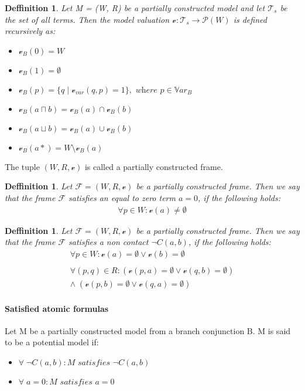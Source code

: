 \documentclass{article}
\newtheorem{defn}[theorem]{Deffinition}
\newcommand{\vVar}{\mathscr{v}_{var}}
\newcommand{\Var}{\mathbb{V}ar}
\newcommand{\vE}{\mathscr{v}}
\newcommand{\vBool}{\mathscr{v}_B}
\newcommand{\Ts}{\mathcal{T}_s}
\begin{document}
	\begin{defn}
		Let M = (W, R) be a partially constructed model and let $\Ts$ be the set of all terms. Then the model valuation $\vE : \Ts \rightarrow \mathscr{P}(W)$ is defined recursively as:
		\begin{itemize}
			\item $\vBool(0) = W$
			\item $\vBool(1) = \emptyset$
			\item $\vBool(p) = \{ q \; | \; \vVar(q, p) = 1\}, \textit{ where } p \in \Var_B$
			\item $\vBool(a \sqcap b) = \vBool(a) \cap \vBool(b)$
			\item $\vBool(a \sqcup b) = \vBool(a) \cup \vBool(b)$
			\item $\vBool(a*) = W \setminus \vBool(a)$
		\end{itemize}
	\end{defn}
		The tuple $(W, R, \vE)$ is called a partially constructed frame.
	\begin{defn}
		Let $\mathscr{F} = (W, R, \vE)$ be a partially constructed frame. Then we say that the frame $\mathscr{F}$ satisfies an equal to zero term $a = 0$, if the following holds:
		\begin{align*}
			\forall p \in W: \vE(a) \ne \emptyset
		\end{align*}
	\end{defn}

	\begin{defn}
		Let $\mathscr{F} = (W, R, \vE)$ be a partially constructed frame. Then we say that the frame $\mathscr{F}$ satisfies a non contact $\neg C(a, b)$, if the following holds:
		\begin{align*}
			\forall p \in W: \vE(a) = \emptyset \lor \vE(b) = \emptyset \\
			\\
			\forall (p, q) \in R: (\vE(p, a) = \emptyset \lor \vE(q, b) = \emptyset) \\ 
				\land \; (\vE(p, b) = \emptyset \lor \vE(q, a) = \emptyset)
		\end{align*}
	\end{defn}													

	\paragraph{Satisfied atomic formulas}
		Let M be a partially constructed model from a branch conjunction B. M is said to be a potential model if: 
		\begin{itemize}
			\item $\forall \; \neg C(a, b) : M \textit{ satisfies } \neg C(a, b)$
			\item $\forall \; a = 0 : M \textit{ satisfies } a = 0$
		\end{itemize}
\end{document}
